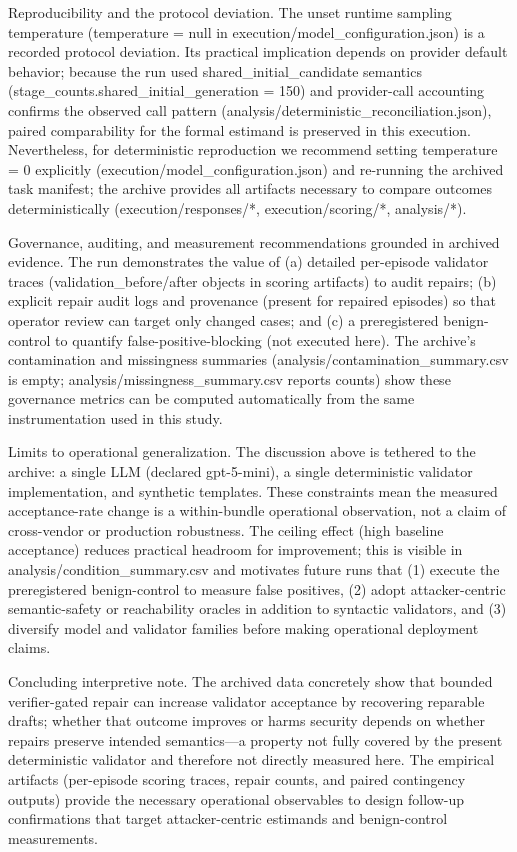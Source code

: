 \documentclass[conference]{IEEEtran}
\begin{document}
Reproducibility and the protocol deviation. The unset runtime sampling temperature (temperature = null in execution/model\_configuration.json) is a recorded protocol deviation. Its practical implication depends on provider default behavior; because the run used shared\_initial\_candidate semantics (stage\_counts.shared\_initial\_generation = 150) and provider-call accounting confirms the observed call pattern (analysis/deterministic\_reconciliation.json), paired comparability for the formal estimand is preserved in this execution. Nevertheless, for deterministic reproduction we recommend setting temperature = 0 explicitly (execution/model\_configuration.json) and re-running the archived task manifest; the archive provides all artifacts necessary to compare outcomes deterministically (execution/responses/*, execution/scoring/*, analysis/*).

Governance, auditing, and measurement recommendations grounded in archived evidence. The run demonstrates the value of (a) detailed per-episode validator traces (validation\_before/after objects in scoring artifacts) to audit repairs; (b) explicit repair audit logs and provenance (present for repaired episodes) so that operator review can target only changed cases; and (c) a preregistered benign-control to quantify false-positive-blocking (not executed here). The archive's contamination and missingness summaries (analysis/contamination\_summary.csv is empty; analysis/missingness\_summary.csv reports counts) show these governance metrics can be computed automatically from the same instrumentation used in this study.

Limits to operational generalization. The discussion above is tethered to the archive: a single LLM (declared gpt-5-mini), a single deterministic validator implementation, and synthetic templates. These constraints mean the measured acceptance-rate change is a within-bundle operational observation, not a claim of cross-vendor or production robustness. The ceiling effect (high baseline acceptance) reduces practical headroom for improvement; this is visible in analysis/condition\_summary.csv and motivates future runs that (1) execute the preregistered benign-control to measure false positives, (2) adopt attacker-centric semantic-safety or reachability oracles in addition to syntactic validators, and (3) diversify model and validator families before making operational deployment claims.

Concluding interpretive note. The archived data concretely show that bounded verifier-gated repair can increase validator acceptance by recovering reparable drafts; whether that outcome improves or harms security depends on whether repairs preserve intended semantics---a property not fully covered by the present deterministic validator and therefore not directly measured here. The empirical artifacts (per-episode scoring traces, repair counts, and paired contingency outputs) provide the necessary operational observables to design follow-up confirmations that target attacker-centric estimands and benign-control measurements.
\end{document}
